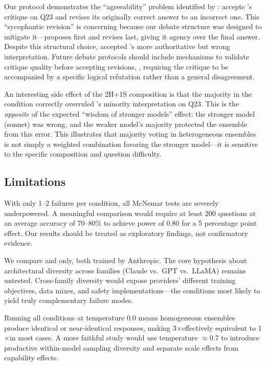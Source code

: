 Our \debate protocol demonstrates the ``agreeability'' problem identified
by \citet{du2023debate}: \haiku accepts \sonnet's critique on Q23
and revises its originally correct answer to an incorrect one.
This ``sycophantic revision'' is concerning because our debate structure was
designed to mitigate it---\haiku proposes first and revises last,
giving it agency over the final answer.
Despite this structural choice, \haiku accepted \sonnet's more authoritative
but wrong interpretation.
Future debate protocols should include mechanisms to validate critique quality
before accepting revisions, \eg, requiring the critique to be accompanied
by a specific logical refutation rather than a general disagreement.

An interesting side effect of the 2H+1S composition is that the \haiku majority
in the \hetero condition correctly overruled \sonnet's minority interpretation on Q23.
This is the \emph{opposite} of the expected ``wisdom of stronger models'' effect:
the stronger model (sonnet) was wrong, and the weaker model's majority protected
the ensemble from this error.
This illustrates that majority voting in heterogeneous ensembles is not simply
a weighted combination favoring the stronger model---it is sensitive to the
specific composition and question difficulty.

\subsection{Limitations}

With only 1--2 failures per condition, all McNemar tests are severely underpowered.
A meaningful comparison would require at least 200 questions at an average
accuracy of 70--80\% to achieve power of 0.80 for a 5 percentage point effect.
Our results should be treated as exploratory findings, not confirmatory evidence.

We compare \haiku and \sonnet only, both trained by Anthropic.
The core hypothesis about architectural diversity across families
(Claude vs.\ GPT vs.\ LLaMA) remains untested. Cross-family diversity
would expose providers' different training objectives, data mixes,
and safety implementations---the conditions most likely to yield
truly complementary failure modes.

Running all conditions at temperature 0.0 means homogeneous ensembles produce
identical or near-identical responses, making 3$\times$\haiku effectively
equivalent to 1$\times$\haiku in most cases.
A more faithful study would use temperature $\approx$0.7 to introduce
productive within-model sampling diversity and separate scale effects
from capability effects.

